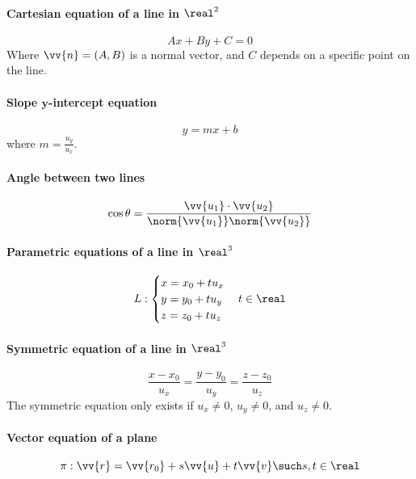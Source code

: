 \paragraph{Cartesian equation of a line in $\real^2$}
	\begin{equation}
		Ax + By + C = 0
	\end{equation}
	Where $\vv{n} = (A,B)$ is a normal vector, and $C$ depends on a specific point on the line.
\paragraph{Slope $\boldsymbol{y}$-intercept equation}
	\begin{equation}
		y = mx + b
	\end{equation}
	where $m = \frac{u_y}{u_x}$.
\paragraph{Angle between two lines}
	\begin{equation}
		\cos \theta = \frac{\vv{u_1} \cdot \vv{u_2}}{\norm{\vv{u_1}}\norm{\vv{u_2}}}
	\end{equation}
\paragraph{Parametric equations of a line in $\real^3$}
	\begin{equation}
		L:
		\begin{cases}
			x = x_0 + tu_x\\
			y = y_0 + tu_y\\
			z = z_0 + tu_z
		\end{cases}
		t \in \real
	\end{equation}
\paragraph{Symmetric equation of a line in $\real^3$}
	\begin{equation}
		\frac{x-x_0}{u_x} = \frac{y-y_0}{u_y} = \frac{z-z_0}{u_z}
	\end{equation}
	The symmetric equation only exists if $u_x \neq 0$, $u_y \neq 0$, and $u_z \neq 0$.
\paragraph{Vector equation of a plane}
	\begin{equation}
		\pi : \vv{r} = \vv{r_0} + s\vv{u} + t\vv{v} \such s,t \in \real
	\end{equation}

